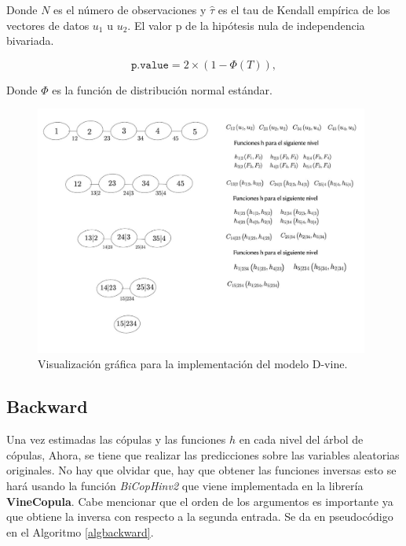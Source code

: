 Donde $N$ es el número de observaciones y $\hat{\tau}$ es el tau de Kendall empírica de los vectores de datos $u_1$ u $u_2$. El valor p de la hipótesis nula de independencia bivariada.

\begin{equation}
    \texttt{p.value} = 2 \times \left(1 - \Phi\left(T\right)\right),
\end{equation}


Donde $\Phi$ es la función de distribución normal estándar.

\begin{figure}[H]
    \centering
    \includegraphics[width = 0.98\textwidth]{Imagenes/Construccion.jpeg}
    \caption{Visualización gráfica para la implementación del modelo D-vine.}
    \label{fig:construccion}
\end{figure}


\subsection{Backward}

Una vez estimadas las cópulas y las funciones $h$  en cada nivel del árbol de cópulas, Ahora, se tiene que realizar las predicciones sobre las variables aleatorias originales. No hay que olvidar que, hay que obtener las funciones inversas esto se hará usando la función \textit{BiCopHinv2} que viene implementada en la librería \textbf{VineCopula}. Cabe mencionar que el orden de los argumentos es importante ya que obtiene la inversa con respecto a la segunda entrada. Se da en pseudocódigo en el Algoritmo \ref{algbackward}.


